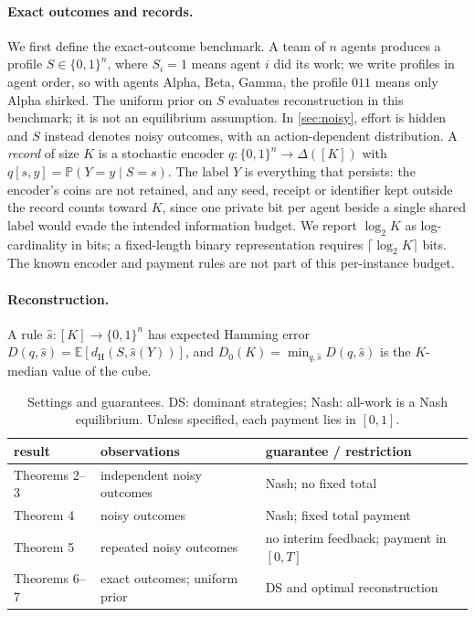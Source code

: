 \documentclass[sigconf,anonymous,acmthm=false]{aamas}
\theoremstyle{acmplain}
\theoremstyle{acmdefinition}
\newcommand{\E}{\mathbb{E}}
\newcommand{\Pb}{\mathbb{P}}
\newcommand{\dH}{d_{\mathrm{H}}}
\newcommand{\shat}{\hat{s}}
\newcommand{\cube}{\{0,1\}}
\newcommand{\A}{\textsf{Alpha}}
\newcommand{\B}{\textsf{Beta}}
\newcommand{\G}{\textsf{Gamma}}
\begin{document}
\paragraph{Exact outcomes and records.} We first define the exact-outcome benchmark. A team of $n$ agents produces a profile
$S\in\cube^n$, where $S_i=1$ means agent $i$ did its work; we write profiles in agent order,
so with agents \A, \B, \G, the profile $011$ means only \A{} shirked. The uniform prior on $S$ evaluates reconstruction in this benchmark; it is not an equilibrium
assumption. In \cref{sec:noisy}, effort is hidden and $S$ instead denotes noisy outcomes,
with an action-dependent distribution. A \emph{record} of size $K$
is a stochastic encoder $q:\cube^n\to\Delta([K])$ with $q[s,y]=\Pb(Y=y\mid S=s)$. The label
$Y$ is everything that persists: the encoder's coins are not retained, and any seed, receipt
or identifier kept outside the record counts toward $K$, since one private bit per agent
beside a single shared label would evade the intended information budget. We report
$\log_2K$ as log-cardinality in bits; a fixed-length binary representation requires
$\lceil\log_2K\rceil$ bits. The known encoder and payment rules are not part of this
per-instance budget.

\paragraph{Reconstruction.} A rule $\shat:[K]\to\cube^n$ has expected Hamming error
$D(q,\shat)=\E[\dH(S,\shat(Y))]$, and $D_0(K)=\min_{q,\shat}D(q,\shat)$ is the $K$-median
value of the cube.

\begin{table}[t]
\caption{Settings and guarantees. DS: dominant strategies; Nash: all-work is a Nash equilibrium.
Unless specified, each payment lies in $[0,1]$.}
\label{tab:settings}
\footnotesize
\begin{tabularx}{\columnwidth}{@{}lXX@{}}
\toprule
result & observations & guarantee / restriction\\
\midrule
Theorems 2--3 & independent noisy outcomes & Nash; no fixed total\\
Theorem 4 & noisy outcomes & Nash; fixed total payment\\
Theorem 5 & repeated noisy outcomes & no interim feedback; payment in $[0,T]$\\
Theorems 6--7 & exact outcomes; uniform prior & DS and optimal reconstruction\\
\bottomrule
\end{tabularx}
\end{table}
\end{document}

